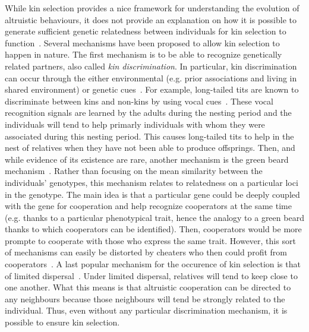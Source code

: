     While kin selection provides a nice framework for understanding the evolution of altruistic behaviours, it does not provide an explanation on how it is possible to generate sufficient genetic relatedness between individuals for kin selection to function~\parencite{West2007}. Several mechanisms have been proposed to allow kin selection to happen in nature. The first mechanism is to be able to recognize genetically related partners, also called \emph{kin discrimination}. In particular, kin discrimination can occur through the either environmental (e.g. prior associations and living in shared environment) or genetic cues~\parencite{Grafen1990}. For example, long-tailed tits are known to discriminate between kins and non-kins by using vocal cues~\parencite{Russell2001, Sharp2005}. These vocal recognition signals are learned by the adults during the nesting period and the individuals will tend to help primarly individuals with whom they were associated during this nesting period. This causes long-tailed tits to help in the nest of relatives when they have not been able to produce offsprings. Then, and while evidence of its existence are rare, another mechanism is the green beard mechanism~\parencite{Hamilton1964, Lehmann2006}. Rather than focusing on the mean similarity between the individuals' genotypes, this mechanism relates to relatedness on a particular loci in the genotype. The main idea is that a particular gene could be deeply coupled with the gene for cooperation and help recognize cooperators at the same time (e.g. thanks to a particular phenotypical trait, hence the analogy to a green beard thanks to which cooperators can be identified). Then, cooperators would be more prompte to cooperate with those who express the same trait. However, this sort of mechanisms can easily be distorted by cheaters who then could profit from cooperators~\parencite{West2007}. A last popular mechanism for the occurence of kin selection is that of limited dispersal~\parencite{Hamilton1972, Griffin2003}. Under limited dispersal, relatives will tend to keep close to one another. What this means is that altruistic cooperation can be directed to any neighbours because those neighbours will tend be strongly related to the individual. Thus, even without any particular discrimination mechanism, it is possible to ensure kin selection.

